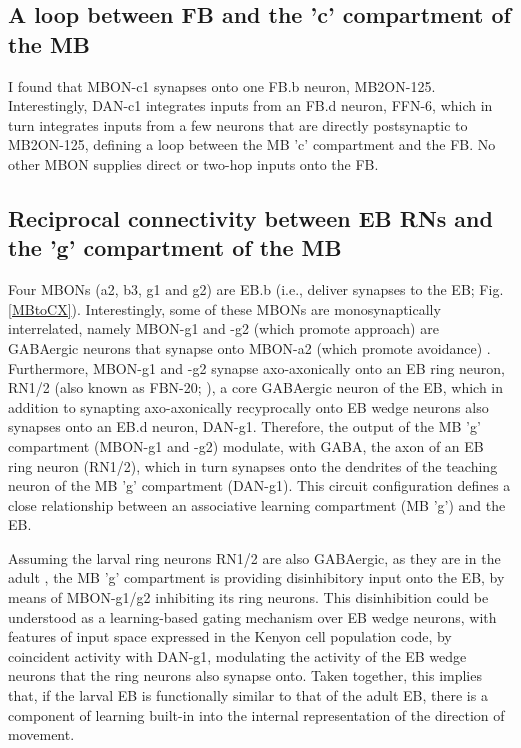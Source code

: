     \subsection{A loop between FB and the 'c' compartment of the MB}
    
    I found that MBON-c1 synapses onto one FB.b neuron, MB2ON-125.
    Interestingly, DAN-c1 integrates inputs from an FB.d neuron, FFN-6, which in turn integrates inputs from a few neurons that are directly postsynaptic to MB2ON-125, defining a loop between the MB 'c' compartment and the FB.
    No other MBON supplies direct or two-hop inputs onto the FB.

    \subsection{Reciprocal connectivity between EB RNs and the 'g' compartment of the MB}

    Four MBONs (a2, b3, g1 and g2) are EB.b (i.e., deliver synapses to the EB; Fig. \ref{MBtoCX}). Interestingly, some of these MBONs are monosynaptically interrelated, namely MBON-g1 and -g2 (which promote approach) are GABAergic neurons that synapse onto MBON-a2 (which promote avoidance) \citep{eschbach2021circuits}.
    Furthermore, MBON-g1 and -g2 synapse axo-axonically onto an EB ring neuron, RN1/2 (also known as FBN-20; \citep{eschbach2021circuits}), a core GABAergic neuron of the EB, which in addition to synapting axo-axonically recyprocally onto EB wedge neurons also synapses onto an EB.d neuron, DAN-g1.
    Therefore, the output of the MB 'g' compartment (MBON-g1 and -g2) modulate, with GABA, the axon of an EB ring neuron (RN1/2), which in turn synapses onto the dendrites of the teaching neuron of the MB 'g' compartment (DAN-g1).  This circuit configuration defines a close relationship between an associative learning compartment (MB 'g') and the EB.

    Assuming the larval ring neurons RN1/2 are also GABAergic, as they are in the adult \citep{hanesch1989neuronal}, the MB 'g' compartment is providing disinhibitory input onto the EB, by means of MBON-g1/g2 inhibiting its ring neurons.
    This disinhibition could be understood as a learning-based gating mechanism over EB wedge neurons, with features of input space expressed in the Kenyon cell population code, by coincident activity with DAN-g1, modulating the activity of the EB wedge neurons that the ring neurons also synapse onto.
    Taken together, this implies that, if the larval EB is functionally similar to that of the adult EB, there is a component of learning built-in into the internal representation of the direction of movement.
    
